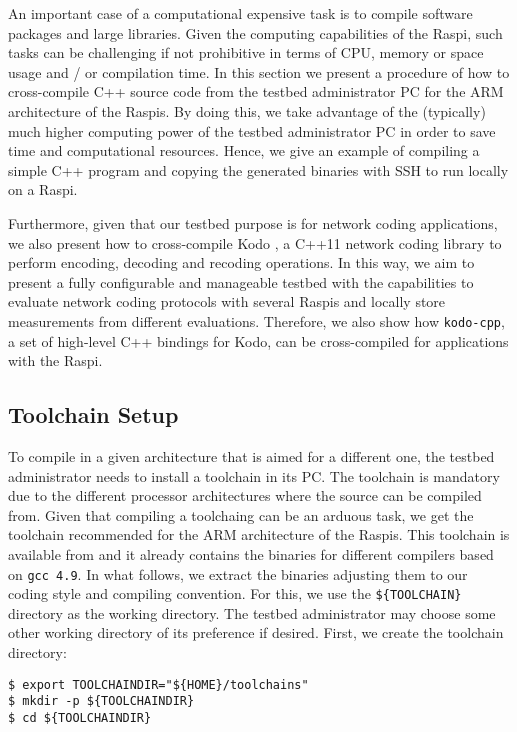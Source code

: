 \label{sec:cross_compilation}
An important case of a computational expensive task is to compile software
packages and large libraries. Given the computing capabilities of the
\ac{Raspi}, such tasks can be challenging if not prohibitive in terms of
\ac{CPU}, memory or space usage and / or compilation time. In
this section we present a procedure of how to cross-compile C++
source code from the testbed administrator \ac{PC} for the \ac{ARM}
architecture of the \ac{Raspi}s. By doing this, we take advantage
of the (typically) much higher computing power of the testbed
administrator \ac{PC} in order to save time and computational resources.
Hence, we give an example of compiling a simple C++ program and
copying the generated binaries with \ac{SSH} to run locally
on a \ac{Raspi}.

Furthermore, given that our testbed purpose is for
network coding applications, we also present how to cross-compile Kodo
\cite{kodo2011pedersen}, a C++11 network coding library to perform
encoding, decoding and recoding operations. In this way, we aim to present
a fully configurable and manageable testbed with the capabilities to
evaluate network coding protocols with several \ac{Raspi}s and locally
store measurements from different evaluations. Therefore, we also show
how \texttt{kodo-cpp}, a set of high-level C++ bindings for Kodo, can be
cross-compiled for applications with the \ac{Raspi}.

\subsection{Toolchain Setup}
To compile in a given architecture that is aimed for a different one,
the testbed administrator needs to install a toolchain in its \ac{PC}.
The toolchain is mandatory due to the different processor architectures
where the source can be compiled from.
Given that compiling a toolchaing can be an arduous task, we get the toolchain
recommended for the \ac{ARM} architecture of the \ac{Raspi}s.
This toolchain is available from \cite{2016steinwurfrpitoolchain} and
it already contains the binaries for different compilers based on
\texttt{gcc 4.9}. In what follows, we extract the binaries adjusting
them to our coding style and compiling convention. For this, we use the
\texttt{\$\{TOOLCHAIN\}} directory as the working directory.
The testbed administrator may choose some other working directory of
its preference if desired. First, we create the toolchain directory:

\begin{lstlisting}[]
$ export TOOLCHAINDIR="${HOME}/toolchains"
$ mkdir -p ${TOOLCHAINDIR}
$ cd ${TOOLCHAINDIR}
\end{lstlisting}
\FloatBarrier
\vspace{-5mm}

